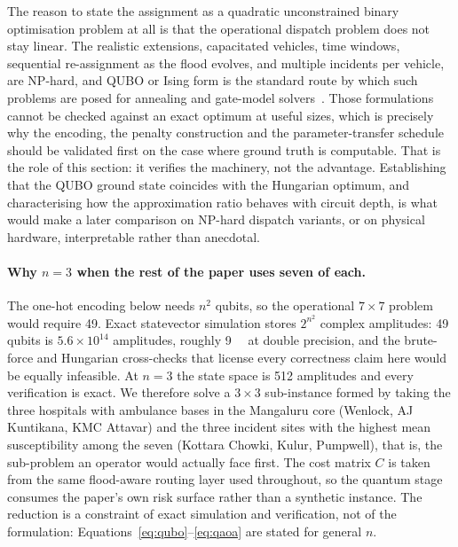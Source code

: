 \documentclass[11pt,a4paper]{article}
\begin{document}
The reason to state the assignment as a quadratic unconstrained binary
optimisation problem at all is that the operational dispatch problem does not stay
linear. The realistic extensions, capacitated vehicles, time windows, sequential
re-assignment as the flood evolves, and multiple incidents per vehicle, are
NP-hard, and QUBO or Ising form is the standard route by which such problems are
posed for annealing and gate-model
solvers~\citep{lucas2014,glover2019,fitzek2024}. Those formulations cannot be
checked against an exact optimum at useful sizes, which is precisely why the
encoding, the penalty construction and the parameter-transfer schedule should be
validated first on the case where ground truth is computable. That is the role of
this section: it verifies the machinery, not the advantage. Establishing that the
QUBO ground state coincides with the Hungarian optimum, and characterising how
the approximation ratio behaves with circuit depth, is what would make a later
comparison on NP-hard dispatch variants, or on physical hardware, interpretable
rather than anecdotal.

\paragraph{Why $n=3$ when the rest of the paper uses seven of each.}
The one-hot encoding below needs $n^2$ qubits, so the operational $7\times7$
problem would require 49. Exact statevector simulation stores $2^{n^2}$ complex
amplitudes: 49 qubits is $5.6\times10^{14}$ amplitudes, roughly \SI{9}{\peta\byte}
at double precision, and the brute-force and Hungarian cross-checks that license
every correctness claim here would be equally infeasible. At $n=3$ the state
space is 512 amplitudes and every verification is exact. We therefore solve a
$3\times3$ sub-instance formed by taking the three hospitals with ambulance
bases in the Mangaluru core (Wenlock, AJ Kuntikana, KMC Attavar) and the three
incident sites with the highest mean susceptibility among the seven (Kottara
Chowki, Kulur, Pumpwell), that is, the sub-problem an operator would actually
face first. The cost matrix $C$ is taken from the same flood-aware routing layer
used throughout, so the quantum stage consumes the paper's own risk surface
rather than a synthetic instance. The reduction is a constraint of exact
simulation and verification, not of the formulation:
Equations~\eqref{eq:qubo}--\eqref{eq:qaoa} are stated for general $n$.
\end{document}
